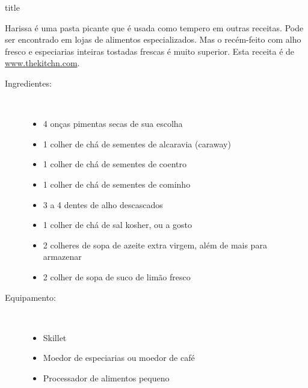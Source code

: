 \documentclass [11pt, papel de carta] {article}
\begin{document}
 {title}

Harissa é uma pasta picante que é usada como tempero em outras receitas. Pode ser encontrado em lojas de alimentos especializados. Mas o recém-feito com alho fresco e especiarias inteiras tostadas frescas é muito superior. Esta receita é de \href {https://www.thekitchn.com/how-to-make-harissa-cooking-lessons-from-the-kitchn-190188} {www.thekitchn.com}.
\begin {description}

\item [Ingredientes:] \ \\
\begin {itemize}
\item 4 onças pimentas secas de sua escolha
\item 1 colher de chá de sementes de alcaravia (caraway)
\item 1 colher de chá de sementes de coentro
\item 1 colher de chá de sementes de cominho
\item 3 a 4 dentes de alho descascados
\item 1 colher de chá de sal kosher, ou a gosto
\item 2 colheres de sopa de azeite extra virgem, além de mais para armazenar
\item 2 colher de sopa de suco de limão fresco
\end {itemize}

\item [Equipamento:] \ \\
\begin {itemize}
\item Skillet
\item Moedor de especiarias ou moedor de café
\item Processador de alimentos pequeno
\end {itemize}



\end{description}
\end{document}
